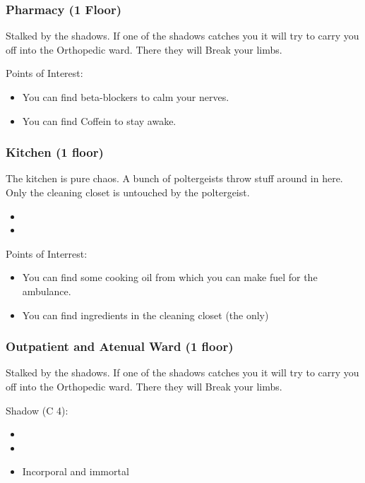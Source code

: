\documentclass[11pt]{article}
\begin{document}
{\subsubsection{Pharmacy (1 Floor)}
\label{sec:orgf215320}

Stalked by the shadows. If one of the shadows catches you it will try to carry you off into the Orthopedic ward. There they will Break your limbs.

Points of Interest:
\begin{itemize}
\item You can find beta-blockers to calm your nerves.
\item You can find Coffein to stay awake.
\end{itemize}
\subsubsection{Kitchen (1 floor)}
\label{sec:org75aab63}

The kitchen is pure chaos. A bunch of poltergeists throw stuff around in here. Only the cleaning closet is untouched by the poltergeist.

\begin{itemize}
\item {}
\item {}
\end{itemize}

Points of Interrest:
\begin{itemize}
\item You can find some cooking oil from which you can make fuel for the ambulance.
\item You can find ingredients in the cleaning closet (the only)
\end{itemize}
\subsubsection{Outpatient and Atenual Ward (1 floor)}
\label{sec:orgdb1b71a}

Stalked by the shadows. If one of the shadows catches you it will try to carry you off into the Orthopedic ward. There they will Break your limbs.

Shadow (C 4):
\begin{itemize}
\item {}
\item {}
\item Incorporal and immortal
\end{itemize}
}
\end{document}
